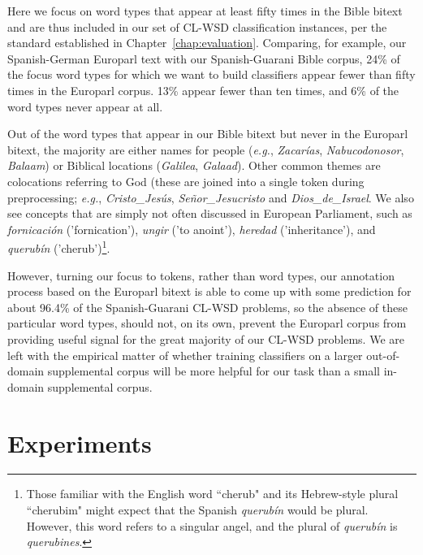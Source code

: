 Here we focus on word types that appear at least fifty times in the Bible
bitext and are thus included in our set of CL-WSD classification instances,
per the standard established in Chapter~\ref{chap:evaluation}.
Comparing, for example, our Spanish-German Europarl text with our
Spanish-Guarani Bible corpus, 24\% of the focus word types for which we want to
build classifiers appear fewer than fifty times in the Europarl corpus. 13\%
appear fewer than ten times, and 6\% of the word types never appear at all.

Out of the word types that appear in our Bible bitext but never in the Europarl
bitext, the majority are either names for people (\emph{e.g.}, \emph{Zacarías},
\emph{Nabucodonosor}, \emph{Balaam}) or Biblical locations (\emph{Galilea},
\emph{Galaad}). Other common themes are colocations referring to God (these are
joined into a single token during preprocessing; \emph{e.g.},
\emph{Cristo\_Jesús}, \emph{Señor\_Jesucristo} and \emph{Dios\_de\_Israel}. We
also see concepts that are simply not often discussed in European Parliament,
such as \emph{fornicación} ('fornication'), \emph{ungir} ('to anoint'),
\emph{heredad} ('inheritance'), and \emph{querubín} ('cherub')\footnote{Those
familiar with the English word ``cherub" and its Hebrew-style plural
``cherubim" might expect that the Spanish \emph{querubín} would be plural.
However, this word refers to a singular angel, and the plural of
\emph{querubín} is \emph{querubines}.}.

However, turning our focus to tokens, rather than word types, our annotation
process based on the Europarl bitext is able to come up with some prediction
for about 96.4\% of the Spanish-Guarani CL-WSD problems, so the absence of
these particular word types, should not, on its own, prevent the Europarl
corpus from providing useful signal for the great majority of our CL-WSD
problems. We are left with the empirical matter of whether training classifiers
on a larger out-of-domain supplemental corpus will be more helpful for our task
than a small in-domain supplemental corpus.



\section{Experiments}
\label{sec:multilingual-experiments}

